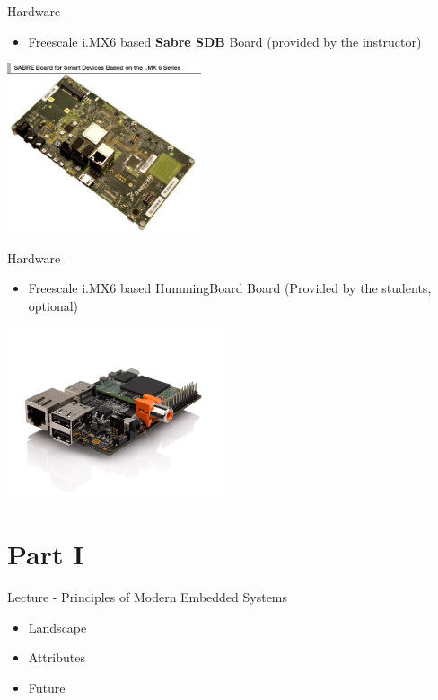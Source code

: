 \documentclass[a4paper,12pt,obeyspaces,spaces,hyphens]{article}
\begin{document}
\feagendatwocolumn
{Hardware}
{
  \begin{itemize}
    \item Freescale i.MX6 based {\bf Sabre SDB} Board (provided by the
      instructor)
  \end{itemize}
}
{}
{
  \begin{center}
    \includegraphics[height=5cm]{agenda/RDIMX6SABREBRD_BD.jpg}
  \end{center}
}

\feagendatwocolumn
{Hardware}
{
  \begin{itemize}
    \item  Freescale i.MX6 based HummingBoard Board (Provided by the students,
      optional)
  \end{itemize}
}
{}
{
  \begin{center}
    \includegraphics[height=5cm]{agenda/HummingBoard-i2.png}
  \end{center}
}

\section{Part I}

\feagendaonecolumn
{Lecture - Principles of Modern Embedded Systems}
{
  \begin{itemize}
    \item Landscape
    \item Attributes
    \item Future
  \end{itemize}
}
\end{document}
